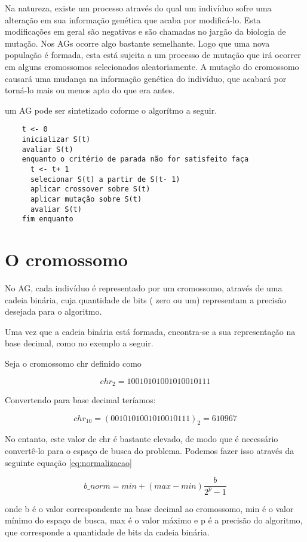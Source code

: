 \documentclass[
    12pt,               %
    twoside,            %
    a4paper,            %
    english,            %
    french,             %
    spanish,            %
    brazil,             %
    ]{abntex2}
\begin{document}
  Na natureza, existe um processo através do qual um indivíduo sofre uma alteração em sua informação genética que acaba por modificá-lo. Esta modificações em geral são negativas e são chamadas no jargão da biologia de mutação. Nos AGs ocorre algo bastante semelhante. Logo que uma nova população é formada, esta está sujeita a um processo de mutação que irá ocorrer em alguns cromossomos selecionados aleatoriamente. A mutação do cromossomo causará uma mudança na informação genética do indivíduo, que acabará por torná-lo mais ou menos apto do que era antes.

  um AG pode ser sintetizado coforme o algorítmo a seguir.

  \begin{verbatim}
    t <- 0
    inicializar S(t)
    avaliar S(t)
    enquanto o critério de parada não for satisfeito faça
      t <- t+ 1
      selecionar S(t) a partir de S(t- 1)
      aplicar crossover sobre S(t)
      aplicar mutação sobre S(t)
      avaliar S(t)
    fim enquanto
  \end{verbatim}

\section{O cromossomo}

  No AG, cada indivíduo é representado por um cromossomo, através de uma cadeia binária, cuja quantidade de bits ( zero ou um) representam a precisão desejada para o algoritmo.

  Uma vez que a cadeia binária está formada, encontra-se a sua representação na base decimal, como no exemplo a seguir.

  Seja o cromossomo chr definido como

  $$chr_2 = 10010101001010010111$$

  Convertendo para base decimal teríamos:

  $$chr_{10} = (0010101001010010111)_2 = 610967$$

  No entanto, este valor de chr é bastante elevado, de modo que é necessário convertê-lo para o espaço de busca do problema. Podemos fazer isso através da seguinte equação \ref{eq:normalizacao}

  \begin{equation}
    b\_norm = min + (max - min) \frac{b}{2^p -1}
    \label{eq:normalizacao}
  \end{equation}
  

  onde b é o valor correspondente na base decimal ao cromossomo, min é o valor mínimo do espaço de busca, max é o valor máximo e p é a precisão do algoritmo, que corresponde a quantidade de bits da cadeia binária.
\end{document}
